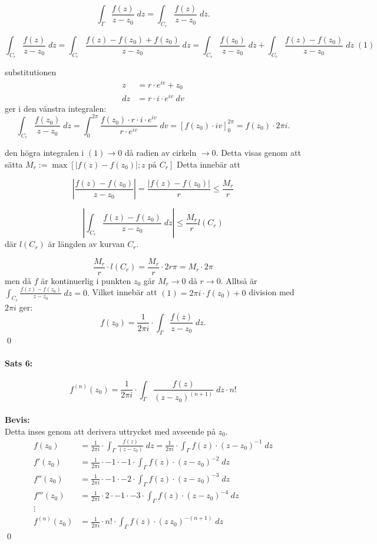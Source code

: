 \[ \int_\Gamma \frac {f(z)} {z - z_0} \; dz = \int_{C_r} \frac {f(z)} {z - z_0} \; dz. \]

\[ \int_{C_r} \frac {f(z)} {z - z_0} \; dz = \int_{C_r} \frac {f(z) - f(z_0) + f(z_0)} {z - z_0} \; dz =
	\int_{C_r} \frac {f(z_0)} {z - z_0} \; dz + \int_{C_r} \frac {f(z) - f(z_0)} {z - z_0} \; dz \;(1) \]

substitutionen 
\begin{align*}
	z  &= r \cdot e^{iv} + z_0 \\
	dz &= r \cdot i \cdot e^{iv} \; dv
\end{align*}
ger i den vänstra integralen:
\[ \int_{C_r} \frac {f(z_0)} {z - z_0} \; dz = \int_0^{2\pi} \frac {f(z_0) \cdot r \cdot i \cdot e^{iv} } { r \cdot e^{iv}} \; dv =
	\left [f(z_0) \cdot iv \right ]_0^{2\pi} = f(z_0) \cdot 2 \pi i. \]

den högra integralen i $(1) \rightarrow 0$ då radien av cirkeln $\rightarrow 0$.
Detta visas genom att sätta $M_r := \operatorname{max} [|f(z) - f(z_0)|; z \text{ på } C_r]$
Detta innebär att

\[
	\left | \frac {f(z) - f(z_0)} {z - z_0} \right | = \frac {|f(z) - f(z_0)|} {r} \leq \frac {M_r} {r}
\]

\[
	\left | \int_{C_r} \frac {f(z) - f(z_0)} {z - z_0} \; dz \right | \leq \frac {M_r} {r} l(C_r)
\]
där $l(C_r)$ är längden av kurvan $C_r$.

\[
\frac {M_r} {r} \cdot l(C_r) = \frac {M_r} {r} \cdot 2r\pi = M_r \cdot 2 \pi
\]
men då $f$ är kontinuerlig i punkten $z_0$ går $M_r \rightarrow 0$ då $r \rightarrow 0$.
Alltså är $\int_{C_r} \frac {f(z) - f(z_0)} {z - z_0} \; dz = 0.$ Vilket innebär att $(1) = 2\pi i \cdot f(z_0) + 0$
division med $2\pi i$ ger:
\[
	f(z_0) = \frac {1} {2 \pi i} \cdot \int_{\Gamma} \frac {f(z)} {z - z_0} \; dz.
\]
\hfill \qed
\\

\paragraph{Sats 6:}
\[
	f^{(n)}(z_0) = \frac {1} {2 \pi i} \cdot \int_{\Gamma} \frac {f(z)} {(z - z_0)^{(n + 1)}} \; dz \cdot n!
\]
\\
{\bf Bevis:}\\
Detta inses genom att derivera uttrycket med avseende på $z_0$.
\begin{align*}
	f(z_0) &= \frac {1} {2 \pi i} \cdot \int_{\Gamma} \frac {f(z)} {(z - z_0)} \; dz = \frac {1} {2 \pi i} \cdot \int_{\Gamma}
		f(z) \cdot (z - z_0)^{-1} \; dz \\
	f'(z_0) &= \frac {1} {2 \pi i} \cdot -1 \cdot -1 \cdot \int_{\Gamma} f(z) \cdot (z - z_0)^{-2} \; dz \\
	f''(z_0) &= \frac {1} {2 \pi i} \cdot -1 \cdot -2 \cdot \int_{\Gamma} f(z) \cdot (z - z_0)^{-3} \; dz \\
	f'''(z_0) &= \frac {1} {2 \pi i} \cdot 2 \cdot -1 \cdot -3 \cdot \int_{\Gamma} f(z) \cdot (z - z_0)^{-4} \; dz \\
	\vdots \\
	f^{(n)}(z_0) &= \frac {1} {2 \pi i} \cdot n! \cdot \int_\Gamma f(z) \cdot (z \ z_0)^{-(n + 1)} \; dz
\end{align*} %
\hfill \qed
\pagebreak
